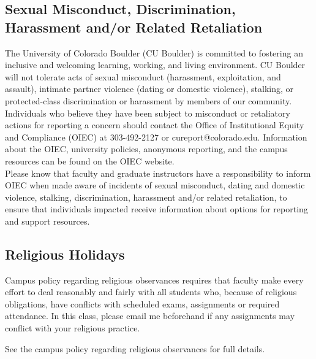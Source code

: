 \documentclass[9pt]{article}
\begin{document}
{\subsection{Sexual Misconduct, Discrimination, Harassment and/or Related Retaliation}

The University of Colorado Boulder (CU Boulder) is committed to fostering an inclusive and welcoming learning, working, and living environment. CU Boulder will not tolerate acts of sexual misconduct (harassment, exploitation, and assault), intimate partner violence (dating or domestic violence), stalking, or protected-class discrimination or harassment by members of our community. Individuals who believe they have been subject to misconduct or retaliatory actions for reporting a concern should contact the Office of Institutional Equity and Compliance (OIEC) at 303-492-2127 or cureport@colorado.edu. Information about the OIEC, university policies, anonymous reporting, and the campus resources can be found on the OIEC website.\\

Please know that faculty and graduate instructors have a responsibility to inform OIEC when made aware of incidents of sexual misconduct, dating and domestic violence, stalking, discrimination, harassment and/or related retaliation, to ensure that individuals impacted receive information about options for reporting and support resources.

\subsection{Religious Holidays}
Campus policy regarding religious observances requires that faculty make every effort to deal reasonably and fairly with all students who, because of religious obligations, have conflicts with scheduled exams, assignments or required attendance.  In this class, please email me beforehand if any assignments may conflict with your religious practice.

See the campus policy regarding religious observances for full details.

}
\end{document}

